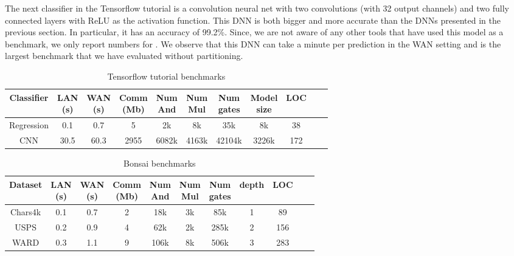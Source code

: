 The next classifier in the Tensorflow tutorial is a convolution neural net with two convolutions
(with 32 output channels) and two fully connected layers with ReLU as the activation function.
This DNN is both bigger and more accurate than the DNNs presented in the previous section.
In particular, it has an accuracy of 99.2\%.
Since, we are not aware of any other tools that have used this
model as a benchmark, we only report numbers for \tool.
We observe that this DNN can take a minute per prediction in the WAN
setting and is the largest benchmark that we have evaluated without
partitioning.


\setlength\tabcolsep{2.5pt}
\begin{table}
\footnotesize
\begin{tabular}{|c|c|c|c |c|c|c|c|c|c | c}
\hline
Classifier       & \thead{LAN  \\ (s)} & \thead{WAN \\(s)} & \thead{Comm \\(Mb)}  & \thead{Num \\ And} & \thead{Num \\ Mul} & \thead{Num \\ gates} & \thead{Model \\size} & LOC\\
\hline
Regression &  0.1         & 0.7         & 5            & 2k    & 8k    &  35k    & 8k   & 38\\
\hline
CNN        &  30.5        & 60.3        & 2955         & 6082k & 4163k &  42104k & 3226k& 172\\
\hline
\end{tabular}

 \caption{Tensorflow tutorial benchmarks}
 \label{tab:tf} 
\end{table}
\setlength\tabcolsep{3.5pt}
\begin{table}
\footnotesize
\begin{tabular}{|c|c|c|c |c|c|c|c|c|c | c|}
\hline
Dataset       & \thead{LAN \\(s)} & \thead{WAN \\(s)} & \thead{Comm \\ (Mb)}  & \thead{Num \\ And} & \thead{Num \\ Mul} & \thead{Num \\ gates} & depth & LOC\\
\hline
Chars4k    &  0.1         & 0.7         & 2            & 18k    & 3k    &  85k     & 1   & 89\\
\hline
USPS       &  0.2         & 0.9         & 4            & 62k    & 2k    &  285k    & 2   & 156\\
\hline
WARD       &  0.3         & 1.1         & 9            & 106k    & 8k    &  506k    & 3   & 283\\
\hline
\end{tabular}

 \caption{Bonsai benchmarks}
 \label{tab:bonsai} 
\end{table}

